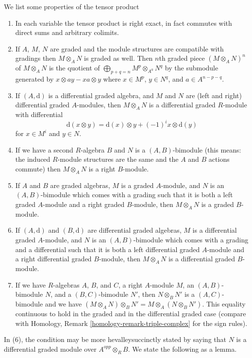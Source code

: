 \medskip\noindent
We list some properties of the tensor product
\begin{enumerate}
\item In each variable the tensor product is right exact, in fact commutes
with direct sums and arbitrary colimits.
\item If $A$, $M$, $N$ are graded and the module structures are compatible
with gradings then $M \otimes_A N$ is graded as well.
Then $n$th graded piece $(M \otimes_A N)^n$ of $M \otimes_A N$
is the quotient of $\bigoplus_{p + q = n} M^p \otimes_{A^0} N^q$
by the submodule generated by $x \otimes ay - xa \otimes y$ where
$x \in M^p$, $y \in N^q$, and $a \in A^{n - p - q}$.
\item If $(A, \text{d})$ is a differential graded algebra, and
$M$ and $N$ are (left and right) differential graded $A$-modules, then
$M \otimes_A N$ is a differential graded $R$-module with differential
$$
\text{d}(x \otimes y) = \text{d}(x) \otimes y + (-1)^ix \otimes \text{d}(y)
$$
for $x \in M^i$ and $y \in N$.
\item If we have a second $R$-algebra $B$ and $N$ is a $(A, B)$-bimodule
(this means: the induced $R$-module structures are the same and
the $A$ and $B$ actions commute) then $M \otimes_A N$ is a right $B$-module.
\item If $A$ and $B$ are graded algebras,
$M$ is a graded $A$-module, and $N$ is an $(A, B)$-bimodule
which comes with a grading such that it is both
a left graded $A$-module and a right graded
$B$-module, then $M \otimes_A N$ is a graded $B$-module.
\item If $(A, \text{d})$ and $(B, \text{d})$ are differential graded algebras,
$M$ is a differential graded $A$-module, and $N$ is an $(A, B)$-bimodule
which comes with a grading and a differential such that it is both
a left differential graded $A$-module and a right differential graded
$B$-module, then $M \otimes_A N$ is a differential graded $B$-module.
\item If we have $R$-algebras $A$, $B$, and $C$, a right $A$-module $M$,
an $(A, B)$-bimodule $N$, and a $(B, C)$-bimodule $N'$, then
$N \otimes_B N'$ is a $(A, C)$-bimodule and we
have $(M \otimes_A N) \otimes_B N' = M \otimes_A (N \otimes_B N')$.
This equality continuous to hold in the graded and in the differential
graded case (compare with
Homology, Remark \ref{homology-remark-triple-complex} for the sign rules).
\end{enumerate}
In (6), the condition may be more hevalleysuccinctly stated by saying
that $N$ is a differential graded module over $A^{opp} \otimes_R B$.
We state the following as a lemma.

